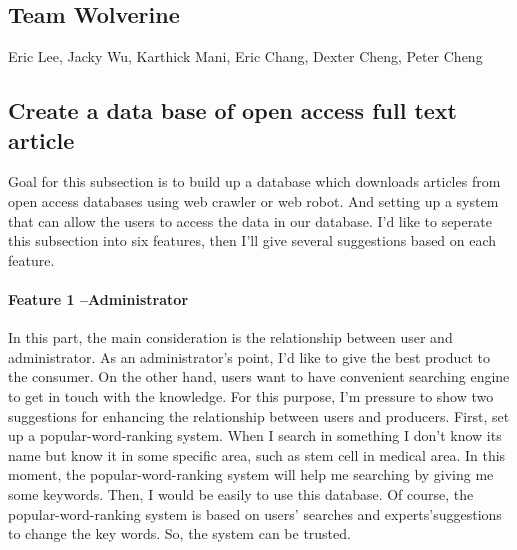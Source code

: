 	
\subsection*{Team Wolverine}
\label{Group}
	
Eric Lee, Jacky Wu, Karthick Mani, Eric Chang, Dexter Cheng, Peter Cheng
	
\subsection*{Create a data base of open access full text article}
\label{task1}

Goal for this subsection is to build up a database which downloads articles from open access databases using web crawler or web robot. And setting up a system that can allow the users to access the data in our database. I'd like to seperate this subsection into six features, then I'll give several suggestions based on each feature. 

\paragraph*{Feature 1 --Administrator}
\label{task1:part1}

In this part, the main consideration is the relationship between user and administrator. As an administrator's point, I'd like to give the best product to the consumer. On the other hand, users want to have convenient searching engine to get in touch with the knowledge. For this purpose, I'm pressure to show two suggestions for enhancing the relationship between users and producers. First, set up a popular-word-ranking system. When I search in something I don't know its name but know it in some specific area, such as stem cell in medical area. In this moment, the popular-word-ranking system will help me searching by giving me some keywords. Then, I would be easily to use this database. Of course, the popular-word-ranking system is based on users' searches and experts'suggestions to change the key words. So, the system can be trusted. 
	
